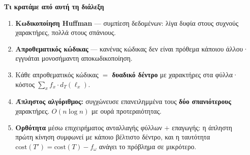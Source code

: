 \documentclass[11pt,a4paper]{article}
\begin{document}
\begin{recapbox}
\textbf{Τι κρατάμε από αυτή τη διάλεξη}
\begin{enumerate}
  \item \textbf{Κωδικοποίηση Huffman} --- συμπίεση δεδομένων: λίγα δυφία στους
  συχνούς χαρακτήρες, πολλά στους σπάνιους.
  \item \textbf{Απροθεματικός κώδικας} --- κανένας κώδικας δεν είναι πρόθεμα
  κάποιου άλλου· εγγυάται μονοσήμαντη αποκωδικοποίηση.
  \item Κάθε απροθεματικός κώδικας $=$ \textbf{δυαδικό δέντρο} με χαρακτήρες στα
  φύλλα· κόστος $\sum_x f_x \cdot d_T(\ell_x)$.
  \item \textbf{Άπληστος αλγόριθμος:} συγχώνευσε επανειλημμένα τους \textbf{δύο
  σπανιότερους} χαρακτήρες. $O(n \log n)$ με ουρά προτεραιότητας.
  \item \textbf{Ορθότητα} μέσω επιχειρήματος ανταλλαγής φύλλων $+$ επαγωγής: η
  άπληστη πρώτη κίνηση συμφωνεί με κάποιο βέλτιστο δέντρο, και η ταυτότητα
  $\text{cost}(T') = \text{cost}(T) - f_\omega$ ανάγει το πρόβλημα σε μικρότερο.
\end{enumerate}
\end{recapbox}

\lecturefooter
\end{document}

